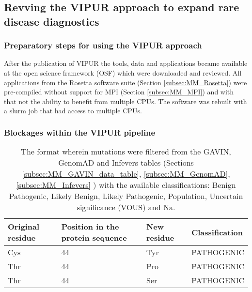 \subsection{Revving the VIPUR approach to expand rare disease diagnostics}
	\subsubsection{Preparatory steps for using the VIPUR approach}
		After the publication of VIPUR the tools, data and applications became available at the open science framework (OSF) \cite{} which were downloaded and reviewed. All applications from the Rosetta software suite (Section \ref{subsec:MM_Rosetta}) were pre-compiled without support for MPI (Section \ref{subsec:MM_MPI}) and with that not the ability to benefit from multiple CPUs. The software was rebuilt with a slurm job that had access to multiple CPUs.
	\label{subsubsec:RES_Prepare}
	
	\subsubsection{Blockages within the VIPUR pipeline}
	
	


\begin{table}[ht]
	\begin{tabular}{ l | l | l | l}
		Original residue & Position in the protein sequence & New residue & Classification\\ \hline
		Cys & 44 & Tyr & PATHOGENIC\\
		Thr & 44 & Pro & PATHOGENIC\\
		Thr & 44 & Ser & PATHOGENIC\\
	\end{tabular}
	\caption{The format wherein mutations were filtered from the GAVIN, GenomAD and Infevers tables (Sections \ref{subsec:MM_GAVIN_data_table},  \ref{subsec:MM_GenomAD}, \ref{subsec:MM_Infevers} ) with the available classifications: Benign Pathogenic, Likely Benign, Likely Pathogenic, Population, Uncertain significance (VOUS) and Na.}
	\label{table:Res_Filtered_Mutations}
\end{table}

